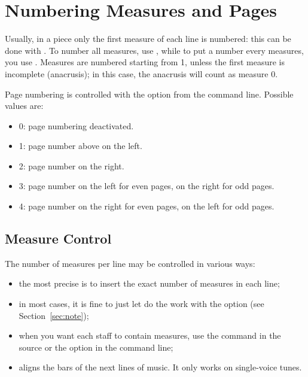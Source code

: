 \documentclass[a4paper,12pt]{book}
\begin{document}

\section{Numbering Measures and Pages}

Usually, in a piece only the first measure of each line is numbered:
this can be done with . To number all measures,
use , while to put a number every 
measures, you use  . Measures are numbered
starting from 1, unless the first measure is incomplete (anacrusis);
in this case, the anacrusis will count as measure 0.

Page numbering is controlled with the option  
from the \abcm{} command line. Possible values are:

\begin{itemize}

  \item 0: page numbering deactivated.
  
  \item 1: page number above on the left.
  
  \item 2: page number on the right.
  
  \item 3: page number on the left for even pages, on the right
  for odd pages.
  
  \item 4: page number on the right for even pages, on the left
  for odd pages.

\end{itemize}


\subsection{Measure Control}

The number of measures per line may be controlled in various ways:

\begin{itemize}
  
  \item the most precise is to insert the exact number of
  measures in each line;
  
  \item in most cases, it is fine to just let \abcm{} do the work with
  the  option (see Section~\ref{sec:note});
  
  \item when you want each staff to contain  measures, use the
  command   in the source or the option
    in the \abcm{} command line;
  
  \item {}  aligns the bars of the next 
   lines of music. It only works on single-voice tunes.  
  
\end{itemize}
\end{document}
